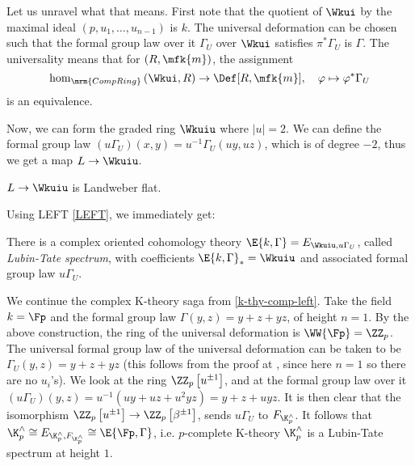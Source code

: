 Let us unravel what that means.
First note that the quotient of $\Wkui$ by the maximal ideal $\left(p, u_1, \dotsc, u_{n-1}\right)$ is $k$.
The universal deformation can be chosen such that the formal group law over it $\Gamma_U$ over $\Wkui$ satisfies $\pi^* \Gamma_U$ is $\Gamma$.
The universality means that for $\left(R, \mfk{m}\right)$, the assignment
$$
\hom_{\mrm{CompRing}}\left(\Wkui, R\right) \to \Def[R, \mfk{m}], \quad
\varphi \mapsto \varphi^* \Gamma_U
$$
is an equivalence.

Now, we can form the graded ring $\Wkuiu$ where $\left|u\right| = 2$.
We can define the formal group law $\left(u \Gamma_U\right) \left(x, y\right) = u^{-1} \Gamma_U \left(u y, u z\right)$, which is of degree $-2$, thus we get a map $L \to \Wkuiu$.

\begin{proposition}
	$L \to \Wkuiu$ is Landweber flat.
\end{proposition}

Using LEFT \ref{LEFT}, we immediately get:

\begin{corollary}\label{lt-spectrum}
	There is a complex oriented cohomology theory $\E{k, \Gamma} = E_{\Wkuiu, u \Gamma_U}$, called \emph{Lubin-Tate spectrum}, with coefficients $\E{k, \Gamma}_* = \Wkuiu$ and associated formal group law $u \Gamma_U$.
\end{corollary}

\begin{example}\label{k-thy-comp-defo}
	We continue the complex K-theory saga from \ref{k-thy-comp-left}.
	Take the field $k = \Fp$ and the formal group law $\Gamma\left(y, z\right) = y + z + y z$, of height $n = 1$.
	By the above construction, the ring of the universal deformation is $\WW{\Fp} = \ZZ_p$.
	The universal formal group law of the universal deformation can be taken to be $\Gamma_U \left(y, z\right) = y + z + y z$ (this follows from the proof at \cite[5.10]{Rez}, since here $n=1$ so there are no $u_i$'s).
	We look at the ring $\ZZ_p\left[u^{\pm1}\right]$, and at the formal group law over it
	$
	\left(u\Gamma_U\right) \left(y, z\right)
	= u^{-1} \left(u y + u z + u^2 y z\right)
	= y + z + u y z
	$.
	It is then clear that the isomorphism $\ZZ_p\left[u^{\pm1}\right] \to \ZZ_p\left[\beta^{\pm1}\right]$, sends $u\Gamma_U$ to $F_{\K_p^\wedge}$.
	It follows that
	$
	\K_p^\wedge
	\cong E_{\K_p^\wedge, F_{\K_p^\wedge}}
	\cong \E{\Fp, \Gamma}
	$,
	i.e. $p$-complete K-theory $\K_p^\wedge$ is a Lubin-Tate spectrum at height $1$.
\end{example}

